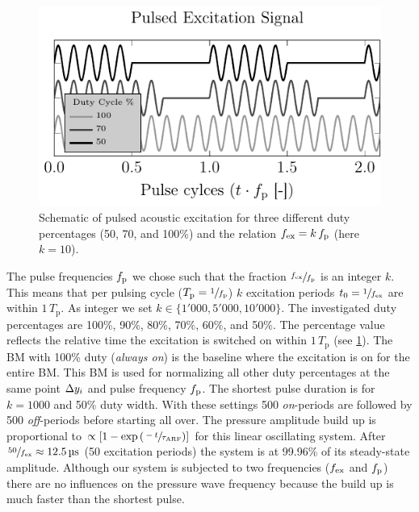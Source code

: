 
\begin{figure}[tbp]
  \centering
  \includegraphics[]{Plots/cache/duty-cycle.pdf}
  \caption{Schematic of pulsed acoustic excitation for three different duty 
      percentages (50, 70, and 100\%) and the relation $f_{\mathrm{ex}}=k\,f_{\mathrm{p}}$ (here 
      $k=10$). 
  }\label{fig:PU-duty_cycle}
\end{figure}

The pulse frequencies $f_{\mathrm{p}}$ we chose such that the fraction $\sfrac{f_{\mathrm{ex}}}{f_{\mathrm{p}}}$ 
is an integer $k$. This means that per pulsing cycle 
($T_{\mathrm{p}}=\sfrac{1}{f_{\mathrm{p}}}$) $k$ excitation periods 
$t_{0}=\sfrac{1}{f_{\mathrm{ex}}}$ are within $1\,T_{\mathrm{p}}$. As integer we set 
$k\in\{1'000, 5'000, 10'000\}$. The investigated duty percentages are 100\%, 
90\%, 80\%, 70\%, 60\%, and 50\%. The percentage value reflects the relative 
time the excitation is switched on within $1\,T_{\mathrm{p}}$ (see 
\cref{fig:PU-duty_cycle}). The BM with 100\% duty (\emph{always on}) is the 
baseline where the excitation is on for the entire BM. This BM is used for 
normalizing all other duty percentages at the same point $\Delta y_{i}$ and pulse 
frequency $f_{\mathrm{p}}$. The shortest pulse duration is for $k=1000$ and 50\% duty 
width. With these settings 500 \emph{on}-periods are followed by 500 
\emph{off}-periods before starting all over. The pressure amplitude build up is 
proportional to $\propto\left[ 1-\exp\left( \sfrac{-t}{\tau_{\mathrm{ARF}}} 
\right) \right]$ for this linear oscillating system. After 
$\sfrac{50}{\fex}\approx\SI{12.5}{\us}$ (50 excitation periods) the system is 
at 99.96\% of its steady-state amplitude. Although our system is subjected to 
two frequencies ($f_{\mathrm{ex}}$ and $f_{\mathrm{p}}$) there are no influences on the pressure wave 
frequency because the build up is much faster than the shortest pulse.

